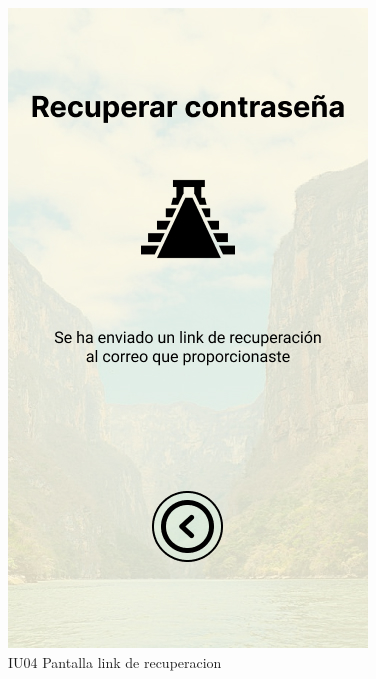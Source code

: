 \begin{figure}[h]
    \begin{minipage}{0.5\textwidth}
        \centering
        \includegraphics[width=.7\linewidth]{Pantallas Prototipo3/IU04 Pantalla link de recuperacion.jpg}
        \caption{IU04 Pantalla link de recuperacion}
    \end{minipage}%
\end{figure}

